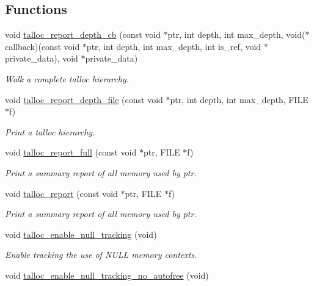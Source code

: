 \subsection*{Functions}
\begin{DoxyCompactItemize}
\item 
void \hyperlink{group__talloc__debug_ga10ceb5acd36e5b97e623907af140d954}{talloc\+\_\+report\+\_\+depth\+\_\+cb} (const void $\ast$ptr, int depth, int max\+\_\+depth, void($\ast$callback)(const void $\ast$ptr,           int depth, int max\+\_\+depth,           int is\+\_\+ref,           void $\ast$private\+\_\+data), void $\ast$private\+\_\+data)
\begin{DoxyCompactList}\small\item\em Walk a complete talloc hierarchy. \end{DoxyCompactList}\item 
void \hyperlink{group__talloc__debug_ga13062669ca8e4b787911c206e339f61c}{talloc\+\_\+report\+\_\+depth\+\_\+file} (const void $\ast$ptr, int depth, int max\+\_\+depth, F\+I\+L\+E $\ast$f)
\begin{DoxyCompactList}\small\item\em Print a talloc hierarchy. \end{DoxyCompactList}\item 
void \hyperlink{group__talloc__debug_ga66136eb6105416bfcbd390ce6a4fc89c}{talloc\+\_\+report\+\_\+full} (const void $\ast$ptr, F\+I\+L\+E $\ast$f)
\begin{DoxyCompactList}\small\item\em Print a summary report of all memory used by ptr. \end{DoxyCompactList}\item 
void \hyperlink{group__talloc__debug_ga4f4ff95ce5a95f61cc453fc943e3de65}{talloc\+\_\+report} (const void $\ast$ptr, F\+I\+L\+E $\ast$f)
\begin{DoxyCompactList}\small\item\em Print a summary report of all memory used by ptr. \end{DoxyCompactList}\item 
void \hyperlink{group__talloc__debug_gad50534c2b22274a94c722f0790ae102f}{talloc\+\_\+enable\+\_\+null\+\_\+tracking} (void)
\begin{DoxyCompactList}\small\item\em Enable tracking the use of N\+U\+L\+L memory contexts. \end{DoxyCompactList}\item 
void \hyperlink{group__talloc__debug_gabd90af3895fee1960e90590fabe92a99}{talloc\+\_\+enable\+\_\+null\+\_\+tracking\+\_\+no\+\_\+autofree} (void)

\end{DoxyCompactItemize}
